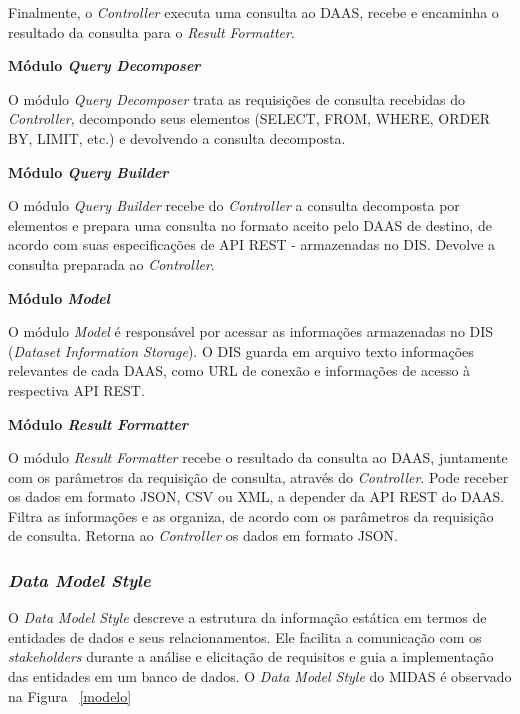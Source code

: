 \documentclass[11pt,a4paper]{article}
\begin{document}
Finalmente, o \textit{Controller} executa uma consulta ao DAAS, recebe e encaminha o resultado da consulta para o \textit{Result Formatter}.

\textbf{Módulo \textit{Query Decomposer}}

O módulo \textit{Query Decomposer} trata as requisições de consulta recebidas do \textit{Controller}, decompondo seus elementos (SELECT, FROM, WHERE, ORDER BY, LIMIT, etc.) e devolvendo a consulta decomposta. 

\textbf{Módulo \textit{Query Builder}}

O módulo \textit{Query Builder} recebe do \textit{Controller} a consulta decomposta por elementos e prepara uma consulta no formato aceito pelo DAAS de destino, de acordo com suas 
especificações de API REST - armazenadas no DIS. Devolve a consulta preparada ao \textit{Controller}. 

\textbf{Módulo \textit{Model}}

O módulo \textit{Model} é responsável por acessar as informações armazenadas no DIS (\textit{Dataset Information Storage}). O DIS guarda em arquivo texto informações relevantes de cada DAAS, como URL de conexão e informações de acesso à respectiva API REST. 

\textbf{Módulo \textit{Result Formatter}}

O módulo \textit{Result Formatter} recebe o resultado da consulta ao DAAS, juntamente com os parâmetros da requisição de consulta, através do \textit{Controller}. Pode receber os dados em formato JSON, CSV ou XML, a depender da API REST do DAAS. 
Filtra as informações e as organiza, de acordo com os parâmetros da requisição de consulta. Retorna ao \textit{Controller} os dados em formato JSON. 

\subsubsection{\textit{Data Model Style}}

O \textit{Data Model Style} descreve a estrutura da informação estática em termos de entidades de dados e seus relacionamentos. Ele facilita a comunicação com os \textit{stakeholders} durante a análise e elicitação de requisitos e guia a implementação das entidades em um banco de dados. O \textit{Data Model Style} do MIDAS é observado na Figura ~\ref{modelo}
\end{document}
